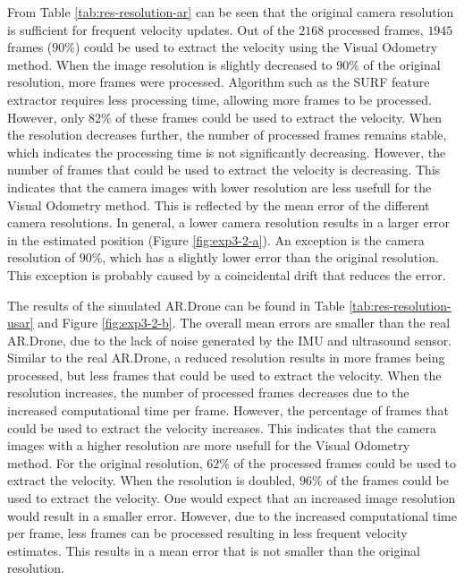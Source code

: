 From Table \ref{tab:res-resolution-ar} can be seen that the original camera resolution is sufficient for frequent velocity updates.
Out of the $2168$ processed frames, $1945$ frames ($90\%$) could be used to extract the velocity using the Visual Odometry method.
When the image resolution is slightly decreased to $90\%$ of the original resolution, more frames were processed.
Algorithm such as the SURF feature extractor requires less processing time, allowing more frames to be processed.
However, only $82\%$ of these frames could be used to extract the velocity.
When the resolution decreases further, the number of processed frames remains stable, which indicates the processing time is not significantly decreasing.
However, the number of frames that could be used to extract the velocity is decreasing.
This indicates that the camera images with lower resolution are less usefull for the Visual Odometry method.
This is reflected by the mean error of the different camera resolutions.
In general, a lower camera resolution results in a larger error in the estimated position (Figure \ref{fig:exp3-2-a}).
An exception is the camera resolution of $90\%$, which has a slightly lower error than the original resolution.
This exception is probably caused by a coincidental drift that reduces the error.

The results of the simulated AR.Drone can be found in Table \ref{tab:res-resolution-usar} and Figure \ref{fig:exp3-2-b}.
The overall mean errors are smaller than the real AR.Drone, due to the lack of noise generated by the IMU and ultrasound sensor.
Similar to the real AR.Drone, a reduced resolution results in more frames being processed, but less frames that could be used to extract the velocity.
When the resolution increases, the number of processed frames decreases due to the increased computational time per frame.
However, the percentage of frames that could be used to extract the velocity increases.
This indicates that the camera images with a higher resolution are more usefull for the Visual Odometry method.
For the original resolution, $62\%$ of the processed frames could be used to extract the velocity. When the resolution is doubled, $96\%$ of the frames could be used to extract the velocity.
One would expect that an increased image resolution would result in a smaller error.
However, due to the increased computational time per frame, less frames can be processed resulting in less frequent velocity estimates.
This results in a mean error that is not smaller than the original resolution.

